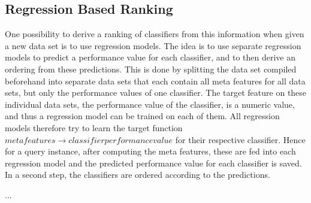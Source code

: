 \subsection{Regression Based Ranking}
One possibility to derive a ranking of classifiers from this information when given a new data set is to use regression models. The idea is to use separate regression models to predict a performance value for each classifier, and to then derive an ordering from these predictions. This is done by splitting the data set compiled beforehand into separate data sets that each contain all meta features for all data sets, but only the performance values of one classifier. The target feature on these individual data sets, the performance value of the classifier, is a numeric value, and thus a regression model can be trained on each of them. All regression models therefore try to learn the target function $meta features \rightarrow classifier performance value$ for their respective classifier. Hence for a query instance, after computing the meta features, these are fed into each regression model and the predicted performance value for each classifier is saved. In a second step, the classifiers are ordered according to the predictions.

\begin{table}[h]
\centering
{}	
\vspace{1em}
...
\vspace{1em}	
	\label{tab:regressionTables}
	\caption{How the regression ranker processes the training data.}
\end{table}

